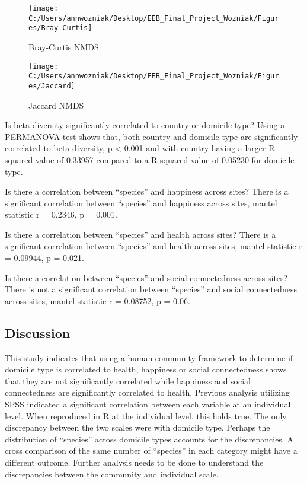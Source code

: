 \begin{Schunk}
\begin{figure}
\texttt{[image: C:/Users/annwozniak/Desktop/EEB\_Final\_Project\_Wozniak/Figures/Bray-Curtis]} \caption[Bray-Curtis NMDS]{Bray-Curtis NMDS}\label{fig:fig.8}
\end{figure}
\end{Schunk}

\begin{Schunk}
\begin{figure}
\texttt{[image: C:/Users/annwozniak/Desktop/EEB\_Final\_Project\_Wozniak/Figures/Jaccard]} \caption[Jaccard NMDS]{Jaccard NMDS}\label{fig:fig.9}
\end{figure}
\end{Schunk}

Is beta diversity significantly correlated to country or domicile type?
Using a PERMANOVA test shows that, both country and domicile type are
significantly correlated to beta diversity, p \textless{} 0.001 and with
country having a larger R-squared value of 0.33957 compared to a
R-squared value of 0.05230 for domicile type.

Is there a correlation between ``species'' and happiness across sites?
There is a significant correlation between ``species'' and happiness
across sites, mantel statistic r = 0.2346, p = 0.001.

Is there a correlation between ``species'' and health across sites?
There is a significant correlation between ``species'' and health across
sites, mantel statistic r = 0.09944, p = 0.021.

Is there a correlation between ``species'' and social connectedness
across sites? There is not a significant correlation between ``species''
and social connectedness across sites, mantel statistic r = 0.08752, p =
0.06.

\hypertarget{discussion}{%
\subsection{Discussion}\label{discussion}}

This study indicates that using a human community framework to determine
if domicile type is correlated to health, happiness or social
connectedness shows that they are not significantly correlated while
happiness and social connectedness are significantly correlated to
health. Previous analysis utilizing SPSS indicated a significant
correlation between each variable at an individual level. When
reproduced in R at the individual level, this holds true. The only
discrepancy between the two scales were with domicile type. Perhaps the
distribution of ``species'' across domicile types accounts for the
discrepancies. A cross comparison of the same number of ``species'' in
each category might have a different outcome. Further analysis needs to
be done to understand the discrepancies between the community and
individual scale.

